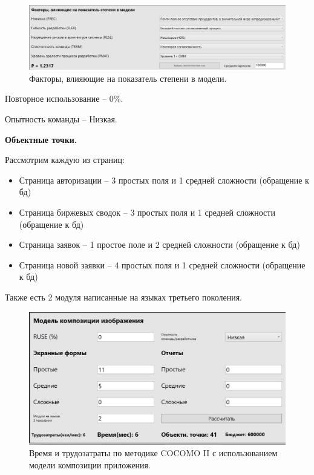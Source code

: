 \documentclass[a4paper,14pt]{extreport} %
\begin{document}
\begin{enumerate}
\begin{figure}[H]
  \centering
  \caption{Факторы, влияющие на показатель степени в модели. }
  \includegraphics[scale=0.25]{factors.jpg}
\end{figure}

Повторное использование -- 0\%.

Опытность команды -- Низкая.

\textbf{Объектные точки.}

Рассмотрим каждую из страниц:
\begin{itemize}
\item Страница авторизации -- 3 простых поля и 1 средней сложности (обращение к бд)
\item Страница биржевых сводок -- 3 простых поля и 1 средней сложности (обращение к бд)
\item Страница заявок -- 1 простое поле и 2 средней сложности (обращение к бд)
\item Страница новой заявки -- 4 простых поля и 1 средней сложности (обращение к бд)
\end{itemize}

Также есть 2 модуля написанные на языках третьего поколения.

 \begin{figure}[H]
  \centering
  \caption{Время и трудозатраты по методике COCOMO II с использованием модели композиции приложения. }
  \includegraphics[scale=0.45]{compose.jpg}
\end{figure}



\end{enumerate}
\end{document}
